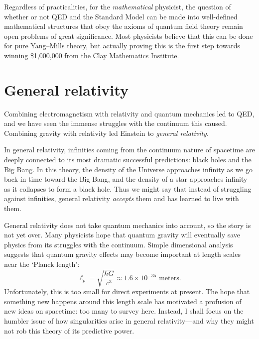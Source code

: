 \documentclass{article}
\begin{document}
Regardless of practicalities, for the \emph{mathematical} physicist, the question of whether or not QED and the Standard Model can be made into well-defined mathematical structures that obey the axioms of quantum field theory remain open problems of great significance.   Most physicists believe that this can be done for pure Yang--Mills theory, but actually proving this is the first step towards winning \$1,000,000 from the Clay Mathematics Institute.

\section{General relativity}

Combining electromagnetism with relativity and quantum mechanics led to QED, and we have seen the immense struggles with the continuum this caused.   Combining gravity with relativity led Einstein to \emph{general relativity}.   

In general relativity, infinities coming from the continuum nature of spacetime are deeply connected to its most dramatic successful predictions: black holes and the Big Bang.   In this theory, the density of the Universe approaches infinity as we go back in time toward the Big Bang, and the density of a star approaches infinity as it collapses to form a black hole.   Thus we might say that instead of struggling against infinities, general relativity \emph{accepts} them and has learned to live with them. 

General relativity does not take quantum mechanics into account, so the story is not  yet over.   Many physicists hope that quantum gravity will eventually save physics from its struggles with the continuum.   Simple dimensional analysis suggests that quantum gravity effects may become important at length scales near the `Planck length':
\[                  \ell_p = \sqrt{\frac{\hbar G}{c^3}} \approx 1.6 \times 10^{-35} \textrm{ meters}  .\]
Unfortunately, this is too small for direct experiments at present.  The hope that something new happens around this length scale has motivated a profusion of new ideas on spacetime: too many to survey here.  Instead, I shall focus on the humbler issue of how singularities arise in general relativity---and why they might not rob this theory of its predictive power.
\end{document}
